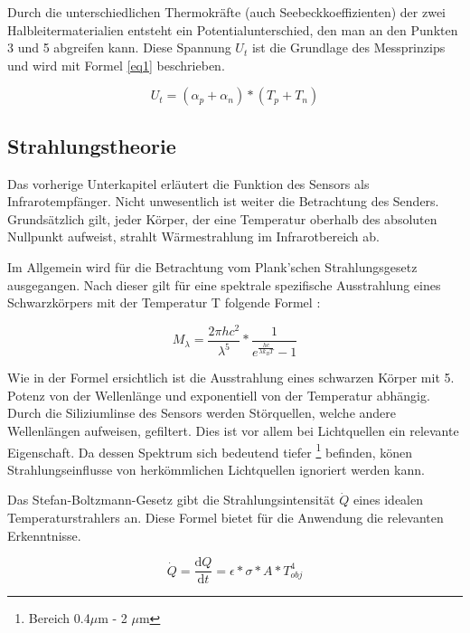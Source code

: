 Durch die unterschiedlichen Thermokräfte (auch Seebeckkoeffizienten) der zwei Halbleitermaterialien entsteht ein Potentialunterschied, den man an den Punkten 3 und 5 abgreifen kann. Diese Spannung $U_{t}$ ist die Grundlage des Messprinzips und wird mit Formel \ref{eq1} \protect\cite{AMG8834} beschrieben.

\begin{equation}
\label{eq1}
U_{t} = (\alpha_{p} + \alpha_{n})*(T_{p}+T_{n})
\end{equation}

\subsection{Strahlungstheorie}
\label{subsec:Strahlungstheorie}
Das vorherige Unterkapitel erläutert die Funktion des Sensors als Infrarotempfänger. Nicht unwesentlich ist weiter die Betrachtung des Senders. Grundsätzlich gilt, jeder Körper, der eine Temperatur oberhalb des absoluten Nullpunkt aufweist, strahlt Wärmestrahlung im Infrarotbereich ab. 

Im Allgemein wird für die Betrachtung vom Plank'schen Strahlungsgesetz ausgegangen. Nach dieser gilt für eine spektrale spezifische Ausstrahlung eines Schwarzkörpers mit der Temperatur T folgende Formel \protect\cite{Thermoformeln}:

\begin{equation}
\label{eq2}
M_{\lambda } = \frac{2\pi h c^2 }{\lambda^5}*\frac{1}{e^\frac{hc}{\lambda k_{B} T}-1}
\end{equation}

Wie in der Formel ersichtlich ist die Ausstrahlung eines schwarzen Körper mit 5. Potenz von der Wellenlänge und exponentiell von der Temperatur abhängig. Durch die Siliziumlinse des Sensors werden Störquellen, welche andere Wellenlängen aufweisen, gefiltert. Dies ist vor allem bei Lichtquellen ein relevante Eigenschaft. Da dessen Spektrum sich bedeutend tiefer \footnote[3]{Bereich 0.4$\mu$m - 2 $\mu$m} befinden, könen Strahlungseinflusse von herkömmlichen Lichtquellen ignoriert werden kann.

Das Stefan-Boltzmann-Gesetz \protect\cite{Thermoformeln} gibt die Strahlungsintensität $\dot{Q}$ eines idealen Temperaturstrahlers an. Diese Formel bietet für die Anwendung die relevanten Erkenntnisse.


\begin{equation}
\label{eq3}
\dot{Q} = \frac{\mathrm{d} Q}{\mathrm{d} t} = \epsilon *\sigma * A * T_{obj}^4
\end{equation}

